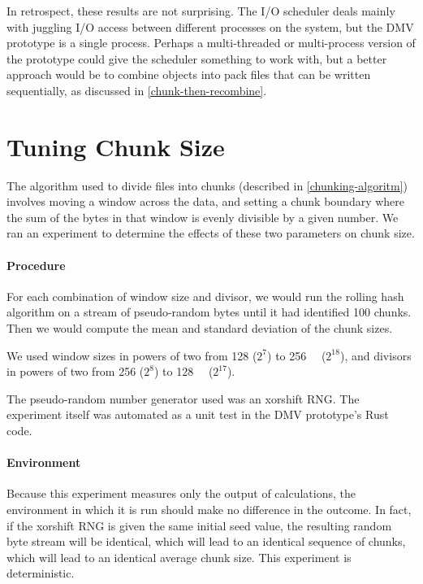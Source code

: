 In retrospect, these results are not surprising. The I/O scheduler deals mainly
with juggling I/O access between different processes on the system, but the
\gls{DMV} prototype is a single process. Perhaps a multi-threaded or multi-process version of the prototype could
give the scheduler something to work with, but a better approach would be to
combine objects into pack files that can be written sequentially, as discussed in \autoref{chunk-then-recombine}.

%



\section{Tuning Chunk Size}\label{rolling-hash-exp}

The algorithm used to divide files into chunks (described in
\autoref{chunking-algoritm}) involves moving a window across the data, and
setting a chunk boundary where the sum of the bytes in that window is evenly
divisible by a given number. We ran an experiment to determine the effects of
these two parameters on chunk size.

\paragraph{Procedure}

For each combination of window size and divisor, we would run the rolling hash
algorithm on a stream of pseudo-random bytes until it had identified \num{100}
chunks. Then we would compute the mean and standard deviation of the chunk
sizes.

We used window sizes in powers of two from \SI{128}{\byte} ($2^7$) to
\SI{256}{\kibi\byte} ($2^{18}$), and divisors in powers of two from \num{256}
($2^8$) to \SI{128}{\kibi\relax} ($2^{17}$).

The pseudo-random number generator used was an xorshift RNG\cite{xorshift_rng}.
The experiment itself was automated as a unit test in the \gls{DMV} prototype's
Rust code.

\paragraph{Environment}

Because this experiment measures only the output of calculations, the
environment in which it is run should make no difference in the outcome. In
fact, if the xorshift RNG is given the same initial seed value, the resulting
random byte stream will be identical, which will lead to an identical sequence
of chunks, which will lead to an identical average chunk size. This experiment
is deterministic.


